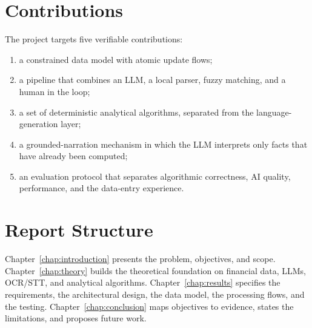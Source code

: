 \section{Contributions}

The project targets five verifiable contributions:

\begin{enumerate}
  \item a constrained data model with atomic update flows;
  \item a pipeline that combines an LLM, a local parser, fuzzy matching,
  and a human in the loop;
  \item a set of deterministic analytical algorithms, separated from the
  language-generation layer;
  \item a grounded-narration mechanism in which the LLM interprets only
  facts that have already been computed;
  \item an evaluation protocol that separates algorithmic correctness,
  AI quality, performance, and the data-entry experience.
\end{enumerate}

\section{Report Structure}

Chapter~\ref{chap:introduction} presents the problem, objectives, and
scope. Chapter~\ref{chap:theory} builds the theoretical foundation on
financial data, LLMs, OCR/STT, and analytical algorithms.
Chapter~\ref{chap:results} specifies the requirements, the architectural
design, the data model, the processing flows, and the testing.
Chapter~\ref{chap:conclusion} maps objectives to evidence, states the
limitations, and proposes future work.

